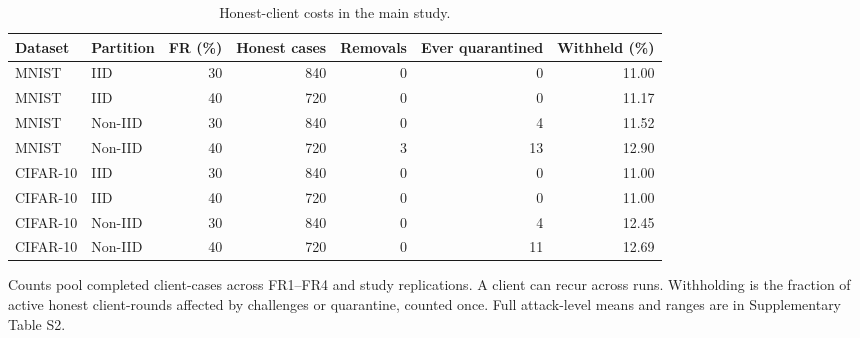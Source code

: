 \begin{table}[t]\centering\footnotesize
\caption{Honest-client costs in the main study.}\label{tab:safety}
\begin{tabular}{llrrrrr}\toprule
Dataset & Partition & FR (\%) & Honest cases & Removals & Ever quarantined & Withheld (\%) \\ \midrule
MNIST & IID & 30 & 840 & 0 & 0 & 11.00 \\
MNIST & IID & 40 & 720 & 0 & 0 & 11.17 \\
MNIST & Non-IID & 30 & 840 & 0 & 4 & 11.52 \\
MNIST & Non-IID & 40 & 720 & 3 & 13 & 12.90 \\
\midrule
CIFAR-10 & IID & 30 & 840 & 0 & 0 & 11.00 \\
CIFAR-10 & IID & 40 & 720 & 0 & 0 & 11.00 \\
CIFAR-10 & Non-IID & 30 & 840 & 0 & 4 & 12.45 \\
CIFAR-10 & Non-IID & 40 & 720 & 0 & 11 & 12.69 \\
\bottomrule\end{tabular}
\par\smallskip\parbox{.96\textwidth}{\scriptsize Counts pool completed client-cases across FR1--FR4 and study replications. A client can recur across runs. Withholding is the fraction of active honest client-rounds affected by challenges or quarantine, counted once. Full attack-level means and ranges are in Supplementary Table S2.}
\end{table}
